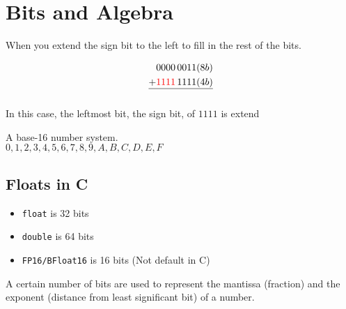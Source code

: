 \chapter*{Bits and Algebra}
\begin{definition}
    When you extend the sign bit to the left to fill in the rest of the bits.
\end{definition}

\begin{example}
    \begin{align*}
          & 0000\,0011 (8b)                  \\
        + & \textcolor{red}{1111}\,1111 (4b) \\
        \hline                               \\
    \end{align*}
    In this case, the leftmost bit, the sign bit, of $1111$ is extend
\end{example}

\begin{definition}
    [Hexadecimal]
    A base-16 number system. \\
    $0, 1, 2, 3, 4, 5, 6, 7, 8, 9, A, B, C, D, E, F$
\end{definition}

\section{Floats in C}
\begin{itemize}
    \item \texttt{float} is 32 bits
    \item \texttt{double} is 64 bits
    \item \texttt{FP16/BFloat16} is 16 bits (Not default in C)
\end{itemize}

\begin{definition}
    A certain number of bits are used to represent the mantissa (fraction) and the exponent (distance from least significant bit) of a number. \\
\end{definition}

